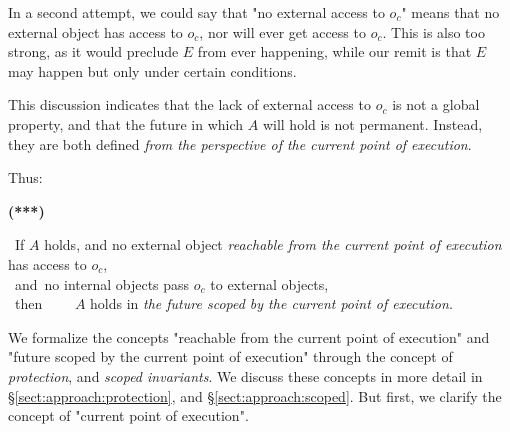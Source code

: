 In a second attempt, we could say that "no external access to  $o_c$" means that no external object has access to $o_c$, nor will ever get access to $o_c$. This is also too strong, as it would preclude $E$ from ever happening, while our remit is that $E$ may happen but only under certain conditions. 

This discussion indicates that the lack of external access to $o_c$ is not a global property, and that the future in which  $A$ will hold is not permanent. 
Instead, they are both defined \emph{from the perspective of the current point of execution}.

Thus:


\vspace{.1cm}

  \begin{minipage}{.05\textwidth}
   \textbf{(***)}
\end{minipage}
\hfill
\begin{minipage}{.95\textwidth}
\begin{flushleft}
\ If $A$ holds,   and  no external object  \emph{reachable from the current point of execution}  has access to $o_c$, \\  
\   and\   no  internal objects pass $o_c$ to external objects,  \\
\ then \ \ \  \ $A$ holds in  \emph{the future scoped by the current point of execution}.  
\end{flushleft}
\end{minipage}

\vspace{.2cm}
 
\noindent 
We formalize the concepts "reachable from the current point of execution" and  "future scoped by the current point of execution"
through the concept of \emph{protection}, and \emph{scoped invariants}. 
We discuss these concepts in more detail in \S \ref{sect:approach:protection}, and \S \ref{sect:approach:scoped}.
But first, we clarify the concept of "current point of execution".

